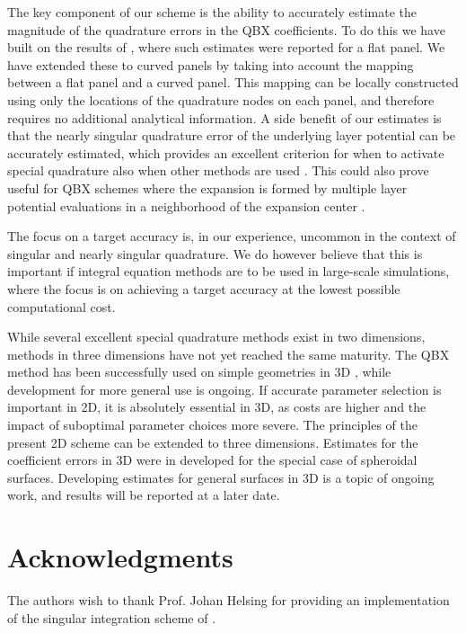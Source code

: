 \documentclass[hidelinks]{siamart1116}
\begin{document}
The key component of our scheme is the ability to accurately estimate
the magnitude of the quadrature errors in the QBX coefficients. To do
this we have built on the results of \cite{AfKlinteberg2016quad},
where such estimates were reported for a flat panel. We have extended
these to curved panels by taking into account the mapping between a
flat panel and a curved panel. This mapping can be locally constructed
using only the locations of the quadrature nodes on each panel, and
therefore requires no additional analytical information. A side
benefit of our estimates is that the nearly singular quadrature error
of the underlying layer potential can be accurately estimated, which
provides an excellent criterion for when to activate special
quadrature also when other methods are used
\cite{Helsing2008,Barnett2015}. This could also prove useful for QBX
schemes where the expansion is formed by multiple layer potential
evaluations in a neighborhood of the expansion center
\cite{Askham2016a,Rahimian2016}.

The focus on a target accuracy is, in our experience, uncommon in the
context of singular and nearly singular quadrature. We do however
believe that this is important if integral equation methods are to be
used in large-scale simulations, where the focus is on achieving a
target accuracy at the lowest possible computational cost.

While several excellent special quadrature methods exist in two
dimensions, methods in three dimensions have not yet reached the same
maturity.  The QBX method has been successfully used on simple
geometries in 3D \cite{AfKlinteberg2016qbx}, while development for
more general use is ongoing. If accurate parameter selection is
important in 2D, it is absolutely essential in 3D, as costs are higher
and the impact of suboptimal parameter choices more severe.  The
principles of the present 2D scheme can be extended to three
dimensions. Estimates for the coefficient errors in 3D were in
\cite{AfKlinteberg2016quad} developed for the special case of
spheroidal surfaces. Developing estimates for general surfaces in 3D
is a topic of ongoing work, and results will be reported at a later
date.

\section*{Acknowledgments}

The authors wish to thank Prof. Johan Helsing for providing an
implementation of the singular integration scheme of
\cite{Helsing2015}.



\end{document}
